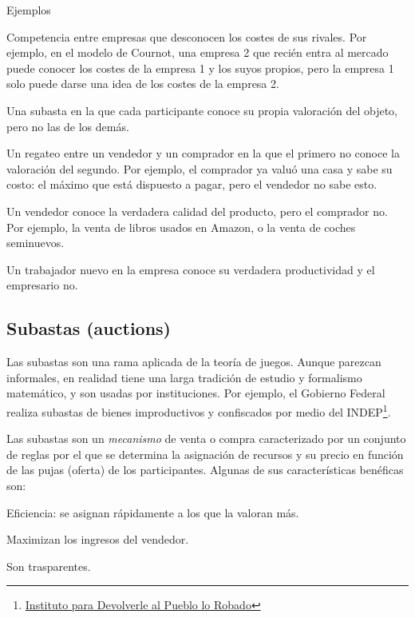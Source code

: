 \documentclass[12pt]{article}
\begin{document}
\begin{exbox}{Ejemplos}
	\begin{myitemize}
		\item Competencia entre empresas que desconocen los costes de sus rivales. Por ejemplo, en el modelo de Cournot, una empresa 2 que recién entra al mercado puede conocer los costes de la empresa 1 y los suyos propios, pero la empresa 1 solo puede darse una idea de los costes de la empresa 2.
		\item Una subasta en la que cada participante conoce su propia valoración del objeto, pero no las de los demás.
		\item Un regateo entre un vendedor y un comprador en la que el primero no conoce la valoración del segundo. Por ejemplo, el comprador ya valuó una casa y sabe su costo: el máximo que está dispuesto a pagar, pero el vendedor no sabe esto.
		\item Un vendedor conoce la verdadera calidad del producto, pero el comprador no. Por ejemplo, la venta de libros usados en Amazon, o la venta de coches seminuevos.
		\item Un trabajador nuevo en la empresa conoce su verdadera productividad y el empresario no.
	\end{myitemize}
\end{exbox}

\subsection*{Subastas (auctions)}

Las subastas son una rama aplicada de la teoría de juegos. Aunque parezcan informales, en realidad tiene una larga tradición de estudio y formalismo matemático, y son usadas por instituciones. Por ejemplo, el Gobierno Federal realiza subastas de bienes improductivos y confiscados por medio del INDEP\footnote{\color{blue}\href{http://subastas.indep.gob.mx/Paginas/Subastas.aspx}{Instituto para Devolverle al Pueblo lo Robado}}.

Las subastas son un \textit{mecanismo} de venta o compra caracterizado por un conjunto de reglas por el que se determina la asignación de recursos y su precio en función de las pujas (oferta) de los participantes. Algunas de sus características benéficas son:

\begin{myitemize}
	\item Eficiencia: se asignan rápidamente a los que la valoran más.
	\item Maximizan los ingresos del vendedor.
	\item Son trasparentes.
\end{myitemize}
\end{document}
